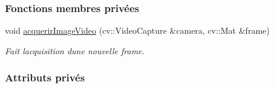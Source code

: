 \subsubsection*{Fonctions membres privées}
\begin{DoxyCompactItemize}
\item 
void \hyperlink{class_camera_afbddcda62053404cbf06a4ba48c62732}{acquerir\+Image\+Video} (cv\+::\+Video\+Capture \&camera, cv\+::\+Mat \&frame)
\begin{DoxyCompactList}\small\item\em Fait l\textquotesingle{}acquisition d\textquotesingle{}une nouvelle frame. \end{DoxyCompactList}\end{DoxyCompactItemize}
\subsubsection*{Attributs privés}
